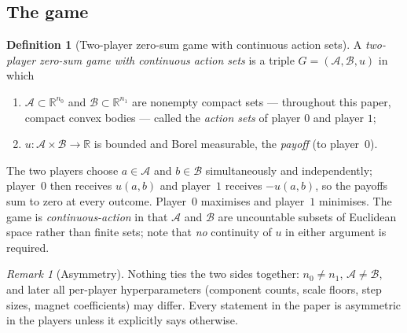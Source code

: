 \documentclass[11pt]{article}
\theoremstyle{definition}
\newtheorem{definition}{Definition}
\theoremstyle{remark}
\newtheorem{remark}{Remark}
\newcommand{\R}{\mathbb{R}}
\newcommand{\cA}{\mathcal{A}}
\newcommand{\cB}{\mathcal{B}}
\begin{document}
\subsection{The game}

\begin{definition}[Two-player zero-sum game with continuous action sets]
\label{def:game}
A \emph{two-player zero-sum game with continuous action sets} is a triple
$G = (\cA, \cB, u)$ in which
\begin{enumerate}[label=(\roman*), leftmargin=2.2em]
\item $\cA \subset \R^{n_0}$ and $\cB \subset \R^{n_1}$ are nonempty compact sets
  --- throughout this paper, compact convex bodies --- called the \emph{action
  sets} of player $0$ and player $1$;
\item $u : \cA \times \cB \to \R$ is bounded and Borel measurable, the
  \emph{payoff} (to player~$0$).
\end{enumerate}
The two players choose $a \in \cA$ and $b \in \cB$ simultaneously and
independently; player~$0$ then receives $u(a,b)$ and player~$1$ receives
$-u(a,b)$, so the payoffs sum to zero at every outcome. Player~$0$ maximises and
player~$1$ minimises. The game is \emph{continuous-action} in that $\cA$ and
$\cB$ are uncountable subsets of Euclidean space rather than finite sets; note
that \emph{no} continuity of $u$ in either argument is required.
\end{definition}

\begin{remark}[Asymmetry]\label{rem:asym}
Nothing ties the two sides together: $n_0 \ne n_1$, $\cA \ne \cB$, and later all
per-player hyperparameters (component counts, scale floors, step sizes, magnet
coefficients) may differ. Every statement in the paper is asymmetric in the
players unless it explicitly says otherwise.
\end{remark}
\end{document}
